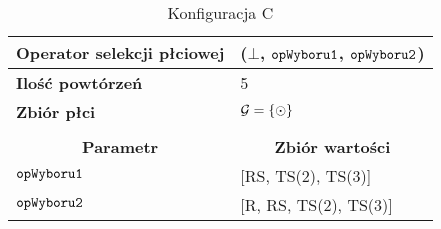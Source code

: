 \documentclass[./FM_mgr.tex]{subfiles}
\begin{document}
\begin{table}[h]
	\caption{Konfiguracja C \label{table:knapsack_config_compare_c}}
	\begin{tabularx}{\linewidth}{lX}
		\hline
		\multicolumn{1}{|l|}{{\bf Operator selekcji płciowej}}        & \multicolumn{1}{l|}{\opName{stdGenSel}($\bot$, $\mathtt{opWyboru1}$, $\mathtt{opWyboru2}$)} \\ \hline
		\multicolumn{1}{|l|}{{\bf Ilość powtórzeń}} & \multicolumn{1}{l|}{5}                                                                      \\ \hline
		\multicolumn{1}{|l|}{{\bf Zbiór płci}} & \multicolumn{1}{l|}{$\mathcal{G} = \{ \odot \}$} \\  \hline
		&                                                                                             \\ \hline
		\multicolumn{1}{|c|}{{\bf Parametr}}        & \multicolumn{1}{c|}{{\bf Zbiór wartości}}                                                   \\ \hline \hline
		\multicolumn{1}{|l|}{$\mathtt{opWyboru1}$}   & \multicolumn{1}{l|}{[RS, TS(2), TS(3)]}                                                   \\ \hline
		\multicolumn{1}{|l|}{$\mathtt{opWyboru2}$}   & \multicolumn{1}{l|}{[R, RS, TS(2), TS(3)]} \\
		\hline
	\end{tabularx}
\end{table}
\end{document}
